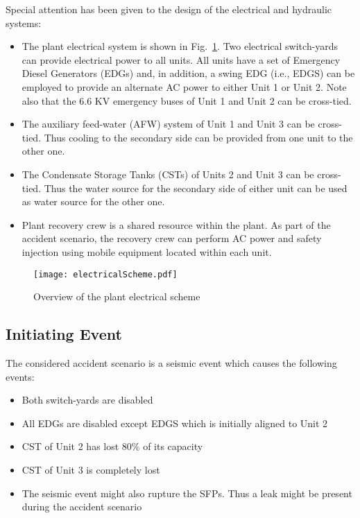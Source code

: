Special attention has been given to the design of the electrical and hydraulic systems:
\begin{itemize}
  \item The plant electrical system is shown in Fig.~\ref{fig:electricalScheme}. Two electrical switch-yards can 
        provide electrical power to all units. All units have a set of Emergency Diesel Generators (EDGs) 
        and, in addition, a swing EDG (i.e., EDGS) can be employed to provide an alternate AC power to either
        Unit 1 or Unit 2. Note also that the 6.6 KV emergency buses of Unit 1 and Unit 2 can be cross-tied.
  \item The auxiliary feed-water (AFW) system of Unit 1 and Unit 3 can be cross-tied. Thus cooling to the 
        secondary side can be provided from one unit to the other one.
  \item The Condensate Storage Tanks (CSTs) of Units 2 and Unit 3 can be cross-tied. Thus the water source 
        for the secondary side of either unit can be used as water source for the other one. 
        \item Plant recovery crew is a shared resource within the plant. As part of the accident scenario, 
        the recovery crew can perform AC power and safety injection using mobile equipment located within each unit.
\end{itemize}

\begin{figure}
    \centering
    \texttt{[image: electricalScheme.pdf]}
    \caption{Overview of the plant electrical scheme}
    \label{fig:electricalScheme}
\end{figure}

\subsection{Initiating Event}

The considered accident scenario is a seismic event which causes the following events:
\begin{itemize}
  \item Both switch-yards are disabled
  \item All EDGs are disabled except EDGS which is initially aligned to Unit 2
  \item CST of Unit 2 has lost 80\% of its capacity 
  \item CST of Unit 3 is completely lost
  \item The seismic event might also rupture the SFPs. Thus a leak might be present during the accident scenario
\end{itemize}

